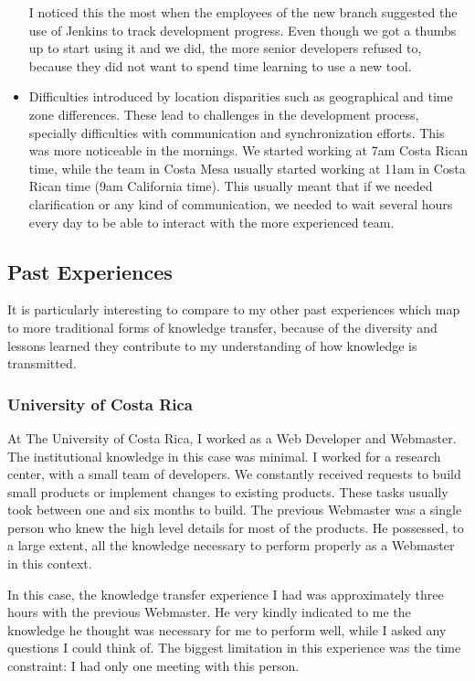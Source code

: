 \documentclass[12pt, letterpaper]{article}
\begin{document}
\begin{itemize}
  I noticed this the most when the employees of the new branch suggested the use of Jenkins to track 
  development progress. Even though we got a thumbs up to start using it and we did,
  the more senior developers refused to, because they did not want to spend time learning to use a new tool.
  \item Difficulties introduced by location disparities such as geographical and time zone differences. These lead to 
  challenges in the development process, specially difficulties with communication and synchronization efforts.
  This was more noticeable in the mornings. We started working at 7am Costa Rican time, while the team in Costa Mesa usually
  started working at 11am in Costa Rican time (9am California time). This usually meant that if we needed clarification
  or any kind of communication, we needed to wait several hours every day to be able to interact with the more experienced team.
  
\end{itemize}

\subsection{Past Experiences}
It is particularly interesting to compare to my other past experiences which map to more traditional forms of knowledge transfer, because of the diversity and lessons learned
they contribute to my understanding of how knowledge is transmitted.

\subsubsection{University of Costa Rica}
At The University of Costa Rica, I worked as a Web Developer and Webmaster. 
The institutional knowledge in this case was minimal.
I worked for a research center, with a small team of developers. We constantly received requests to build small products 
or implement changes to existing products. These tasks usually took between one and six months to build.
The previous Webmaster was a single person who knew the high level details for most of the products. He possessed, 
to a large extent, all the knowledge necessary to perform properly as a Webmaster in this context.

In this case, the knowledge transfer experience I had was approximately three hours with the 
previous Webmaster. He very kindly
indicated to me the knowledge he thought was necessary for me to perform well, while I asked any questions I could 
think of. The biggest limitation in this experience was the time constraint: I had only one meeting with 
this person.
\end{document}
